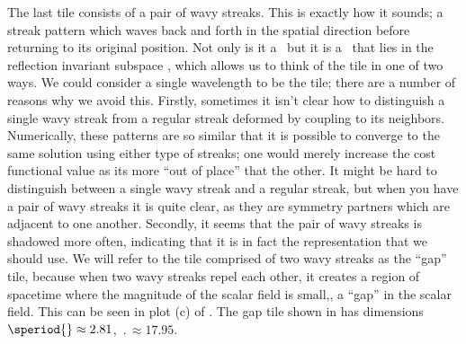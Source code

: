 The last tile consists of a pair
of wavy streaks.
This is exactly how it sounds;
a streak pattern which waves back and forth in
the spatial direction before returning to its
original position.
Not only is it a \twot\ but it is
a \twot\ that lies in the
reflection invariant subspace ,
which allows us to think of the tile in one of
two ways.
We could consider a single wavelength to be the
tile; there are a number of
reasons why we avoid this. Firstly,
sometimes it isn't clear how to distinguish a
single wavy streak from
a regular streak deformed by coupling to its
neighbors. Numerically, these patterns
are so similar that it is possible
to converge to the same solution using either
type of streaks; one would merely increase the
cost functional value as its more ``out of place''
that the other. It might be hard to distinguish between
a single wavy streak and a regular streak, but when you
have a pair of wavy streaks it is quite clear, as
they are symmetry partners which are adjacent to one
another.
Secondly, it seems that the pair of wavy streaks is
shadowed more often, indicating that it is in fact
the representation that we should use.
We will refer to the tile comprised of
two wavy streaks as the
``gap'' tile, because when two wavy streaks
repel each other, it creates a region of spacetime
where the magnitude of the scalar field is
small,\ie, a ``gap'' in the scalar field.
This can be seen in plot (c) of .
The gap tile shown in  has dimensions
$\speriod{} \approx 2.81$, $\period{} \approx 17.95$.



